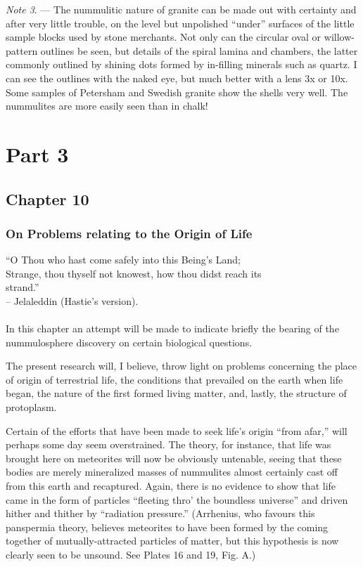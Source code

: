\documentclass[a4paper, 12pt, oneside]{article}
\begin{document}
\emph{Note 3}. --- The nummulitic nature of granite can be made out with certainty and after very little trouble, on the level but unpolished ``under'' surfaces of the little sample blocks used by stone merchants. Not only can the circular oval or willow-pattern outlines be seen, but details of the spiral lamina and chambers, the latter commonly outlined by shining dots formed by in-filling minerals such as quartz. I can see the outlines with the naked eye, but much better with a lens 3x or 10x. Some samples of Petersham and Swedish granite show the shells very well. The nummulites are more easily seen than in chalk!
\clearpage
\section{Part 3}
\subsection{Chapter 10}
\subsubsection{On Problems relating to the Origin of Life}
\begin{displayquote}
``O Thou who hast come safely into this Being's Land;\\Strange, thou thyself not knowest, how thou didst reach its\\strand.''\\-- Jelaleddin (Hastie's version).
\end{displayquote}
\paragraph{}
In this chapter an attempt will be made to indicate briefly the bearing of the nummulosphere discovery on certain biological questions.

The present research will, I believe, throw light on problems concerning the place of origin of terrestrial life, the conditions that prevailed on the earth when life began, the nature of the first formed living matter, and, lastly, the structure of protoplasm.

Certain of the efforts that have been made to seek life's origin ``from afar,'' will perhaps some day seem overstrained. The theory, for instance, that life was brought here on meteorites will now be obviously untenable, seeing that these bodies are merely mineralized masses of nummulites almost certainly cast off from this earth and recaptured. Again, there is no evidence to show that life came in the form of particles ``fleeting thro' the boundless universe'' and driven hither and thither by ``radiation pressure.'' (Arrhenius, who favours this panspermia theory, believes meteorites to have been formed by the coming together of mutually-attracted particles of matter, but this hypothesis is now clearly seen to be unsound. See Plates 16 and 19, Fig. A.)
\end{document}
